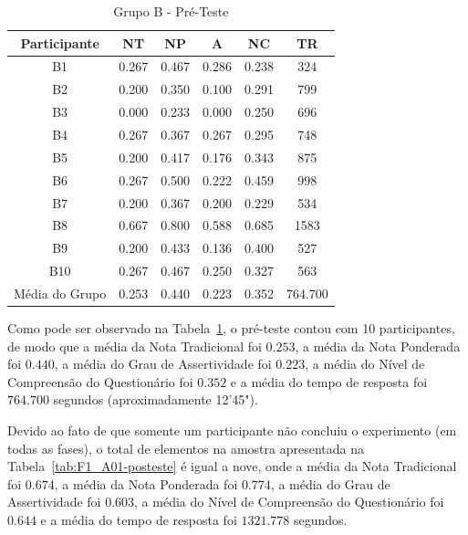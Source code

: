 \begin{table}[htbp]
	\centering
	\caption{Grupo B - Pré-Teste}		
	\begin{tabular}{|c|c|c|c|c|c|}
		\hline
		\rowcolor[HTML]{C0C0C0} 
		\textbf{Participante} & \textbf{NT} & \textbf{NP} & \textbf{A} & \textbf{NC} & \textbf{TR} \\ \hline
		B1 & 0.267 & 0.467 & 0.286 & 0.238 & 324 \\ \hline
		\rowcolor[HTML]{EFEFEF} 
		B2 & 0.200 & 0.350 & 0.100 & 0.291 & 799 \\ \hline
		B3 & 0.000 & 0.233 & 0.000 & 0.250 & 696 \\ \hline
		\rowcolor[HTML]{EFEFEF} 
		B4 & 0.267 & 0.367 & 0.267 & 0.295 & 748 \\ \hline
		B5 & 0.200 & 0.417 & 0.176 & 0.343 & 875 \\ \hline
		\rowcolor[HTML]{EFEFEF} 
		B6 & 0.267 & 0.500 & 0.222 & 0.459 & 998 \\ \hline
		B7 & 0.200 & 0.367 & 0.200 & 0.229 & 534 \\ \hline
		\rowcolor[HTML]{EFEFEF} 
		B8 & 0.667 & 0.800 & 0.588 & 0.685 & 1583 \\ \hline
		B9 & 0.200 & 0.433 & 0.136 & 0.400 & 527 \\ \hline
		\rowcolor[HTML]{EFEFEF} 
		B10 & 0.267 & 0.467 & 0.250 & 0.327 & 563 \\ \hline
		Média do Grupo & 0.253 & 0.440 & 0.223 & 0.352 & 764.700  \\ \hline
	\end{tabular}
	\label{tab:F1_A01-preteste}
\end{table}

Como pode ser observado na Tabela~\ref{tab:F1_A01-preteste}, o pré-teste contou com 10 participantes, de modo que a média da Nota Tradicional foi $0.253$, a média da Nota Ponderada foi $0.440$, a média do Grau de Assertividade foi $0.223$, a média do Nível de Compreensão do Questionário foi $0.352$ e a média do tempo de resposta foi $764.700$ segundos (aproximadamente 12'45").

Devido ao fato de que somente um participante não concluiu o experimento (em todas as fases), o total de elementos na amostra apresentada na Tabela~\ref{tab:F1_A01-posteste} é igual a nove, onde a média da Nota Tradicional foi $0.674$, a média da Nota Ponderada foi $0.774$, a média do Grau de Assertividade foi $0.603$, a média do Nível de Compreensão do Questionário foi $0.644$ e a média do tempo de resposta foi $1321.778$ segundos.


